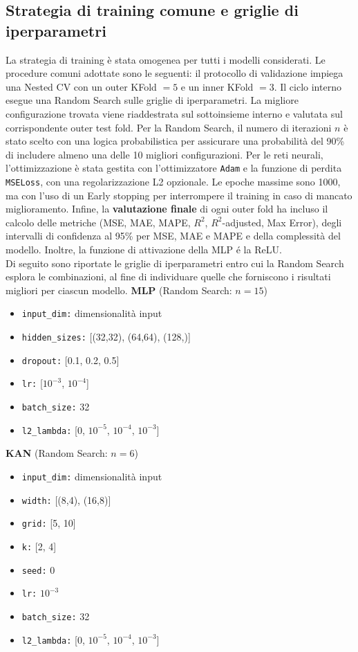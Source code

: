 \documentclass[a4paper,12pt]{report}
\begin{document}
	\subsection{Strategia di training comune e griglie di iperparametri}
	La strategia di training è stata omogenea per tutti i modelli considerati. Le procedure comuni adottate sono le seguenti: il protocollo di validazione impiega una Nested CV con un outer KFold $= 5$ e un inner KFold $= 3$. Il ciclo interno esegue una Random Search sulle griglie di iperparametri. La migliore configurazione trovata viene riaddestrata sul sottoinsieme interno e valutata sul corrispondente outer test fold. Per la Random Search, il numero di iterazioni $n$ è stato scelto con una logica probabilistica per assicurare una probabilità del 90\% di includere almeno una delle 10 migliori configurazioni. Per le reti neurali, l'ottimizzazione è stata gestita con l'ottimizzatore \texttt{Adam} e la funzione di perdita \texttt{MSELoss}, con una regolarizzazione L2 opzionale. Le epoche massime sono 1000, ma con l'uso di un Early stopping per interrompere il training in caso di mancato miglioramento. Infine, la \textbf{valutazione finale} di ogni outer fold ha incluso il calcolo delle metriche (MSE, MAE, MAPE, $R^2$, $R^2$-adjusted, Max Error), degli intervalli di confidenza al 95\% per MSE, MAE e MAPE e della complessità del modello. Inoltre, la funzione di attivazione della MLP é la ReLU. \\
	
	Di seguito sono riportate le griglie di iperparametri entro cui la Random Search esplora le combinazioni, al fine di individuare quelle che forniscono i risultati migliori per ciascun modello.
	\smallskip
	\noindent\textbf{MLP} \quad (Random Search: $n=15$)
	\begin{itemize}
		\item \texttt{input\_dim:} dimensionalità input
		\item \texttt{hidden\_sizes:} [(32,32), (64,64), (128,)]
		\item \texttt{dropout:} [0.1, 0.2, 0.5]
		\item \texttt{lr:} [$10^{-3}$, $10^{-4}$]
		\item \texttt{batch\_size:} 32
		\item \texttt{l2\_lambda:} [0, $10^{-5}$, $10^{-4}$, $10^{-3}$]
	\end{itemize}
	
	\smallskip
	\noindent\textbf{KAN} \quad (Random Search: $n=6$)
	\begin{itemize}
		\item \texttt{input\_dim:} dimensionalità input
		\item \texttt{width:} [(8,4), (16,8)]
		\item \texttt{grid:} [5, 10]
		\item \texttt{k:} [2, 4]
		\item \texttt{seed:} 0
		\item \texttt{lr:} $10^{-3}$
		\item \texttt{batch\_size:} 32
		\item \texttt{l2\_lambda:} [0, $10^{-5}$, $10^{-4}$, $10^{-3}$]
	\end{itemize}
	
\end{document}
